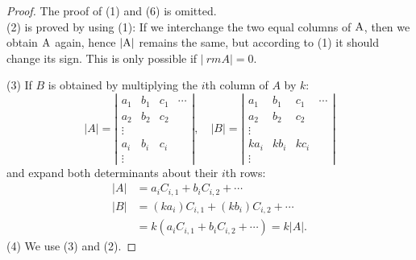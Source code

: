 \documentclass[
  letterpaper,
  DIV=11,
  numbers=noendperiod]{scrartcl}
\theoremstyle{remark}
\begin{document}
\begin{proof}
The proof of (1) and (6) is omitted.\\
(2) is proved by using (1): If we interchange the two equal columns of
\({\rm A}\), then we obtain \({\rm A}\) again, hence \(|{\rm A}|\)
remains the same, but according to (1) it should change its sign. This
is only possible if \(|{\ rmA}|=0.\)

(3) If \(B\) is obtained by multiplying the \(i\)th column of \(A\) by
\(k:\) \[\left| A\right| =\left| 
\begin{array}{cccc}
a_{1} & b_{1} & c_{1} & \cdots \\ 
a_{2} & b_{2} & c_{2} &  \\ 
\vdots &  &  &  \\ 
a_{i} & b_{i} & c_{i} &  \\ 
\vdots &  &  & 
\end{array}
\right| ,\quad \left| B\right| =\left| 
\begin{array}{cccc}
a_{1} & b_{1} & c_{1} & \cdots \\ 
a_{2} & b_{2} & c_{2} &  \\ 
\vdots &  &  &  \\ 
ka_{i} & kb_{i} & kc_{i} &  \\ 
\vdots &  &  & 
\end{array}
\right|\] and expand both determinants about their \(i\)th rows:
\[\begin{aligned}
\left| A\right| &=a_{i}C_{i,1}+b_{i}C_{i,2}+\cdots \\
\left| B\right| &=\left( ka_{i}\right) C_{i,1}+\left( kb_{i}\right)
C_{i,2}+\cdots \\
&=k\left( a_{i}C_{i,1}+b_{i}C_{i,2}+\cdots \right) =k\left| A\right| .
\end{aligned}\] (4) We use (3) and (2).


\end{proof}
\end{document}
